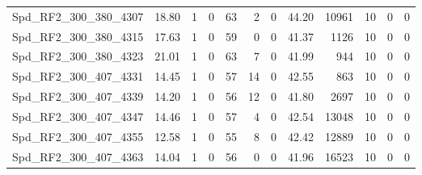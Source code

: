 \begin{longtable}[c]{@{}lrrrrrrrrrrr@{}}
Spd\_RF2\_300\_380\_4307     & 18.80                  & 1                       & 0                       & 63                     & 2                       & 0                       & 44.20                   & 10961                    & 10                       & 0                        & 0                        \\
Spd\_RF2\_300\_380\_4315     & 17.63                  & 1                       & 0                       & 59                     & 0                       & 0                       & 41.37                   & 1126                     & 10                       & 0                        & 0                        \\
Spd\_RF2\_300\_380\_4323     & 21.01                  & 1                       & 0                       & 63                     & 7                       & 0                       & 41.99                   & 944                      & 10                       & 0                        & 0                        \\
Spd\_RF2\_300\_407\_4331     & 14.45                  & 1                       & 0                       & 57                     & 14                      & 0                       & 42.55                   & 863                      & 10                       & 0                        & 0                        \\
Spd\_RF2\_300\_407\_4339     & 14.20                  & 1                       & 0                       & 56                     & 12                      & 0                       & 41.80                   & 2697                     & 10                       & 0                        & 0                        \\
Spd\_RF2\_300\_407\_4347     & 14.46                  & 1                       & 0                       & 57                     & 4                       & 0                       & 42.54                   & 13048                    & 10                       & 0                        & 0                        \\
Spd\_RF2\_300\_407\_4355     & 12.58                  & 1                       & 0                       & 55                     & 8                       & 0                       & 42.42                   & 12889                    & 10                       & 0                        & 0                        \\
Spd\_RF2\_300\_407\_4363     & 14.04                  & 1                       & 0                       & 56                     & 0                       & 0                       & 41.96                   & 16523                    & 10                       & 0                        & 0                        \\

\end{longtable}
